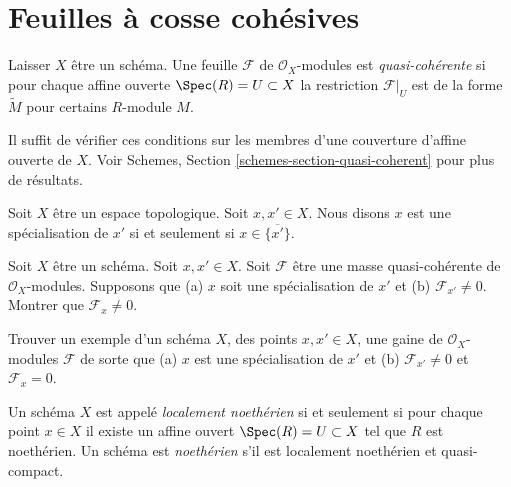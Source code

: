 \section{Feuilles à cosse cohésives }
\label{section-quasi-coherent}

\begin{definition}
\label{definition-quasi-coherent}
Laisser $X$ être
un schéma. Une feuille $\mathcal{F}$ de $\mathcal{O}_X$-modules est {\it quasi-cohérente} si pour
chaque affine ouverte $\Spec(R) = U \subset X$ la restriction
$\mathcal{F}|_U$ est de la forme $\widetilde M$ pour certains $R$-module
$M$.
\end{definition}

\noindent
Il suffit de vérifier ces conditions sur les
membres d'une couverture d'affine
ouverte de $X$. Voir Schemes, Section \ref{schemes-section-quasi-coherent} pour plus
de résultats.

\begin{definition}
\label{definition-specialization}
Soit $X$ être un espace topologique. Soit $x, x' \in
X$. Nous disons $x$ est une spécialisation {\it} de
$x'$ si et seulement si $x \in \overline{\{x'\}}$.
\end{definition}

\begin{exercise}
\label{exercise-quasi-coherent-specialization-points}
Soit $X$ être un schéma. Soit $x, x' \in X$.
Soit $\mathcal{F}$ être une masse quasi-cohérente de $\mathcal{O}_X$-modules. Supposons
que (a) $x$ soit une spécialisation de $x'$ et
(b) $\mathcal{F}_{x'} \not = 0$. Montrer que $\mathcal{F}_x \not = 0$.
\end{exercise}

\begin{exercise}
\label{exercise-O-module-specialization-points}
Trouver un exemple d'un schéma $X$, des points $x, x'
\in X$, une gaine de $\mathcal{O}_X$-modules
$\mathcal{F}$ de sorte que (a) $x$ est une spécialisation de $x'$ et
(b) $\mathcal{F}_{x'} \not = 0$ et $\mathcal{F}_x = 0$.
\end{exercise}

\begin{definition}
\label{definition-Noetherian-scheme}
Un schéma $X$ est appelé {\it localement noethérien} si et seulement
si pour chaque point $x \in X$ il existe un
affine ouvert $\Spec(R) = U \subset X$ tel que
$R$ est noethérien. Un schéma est {\it noethérien} s'il est localement noethérien et quasi-compact.
\end{definition}

